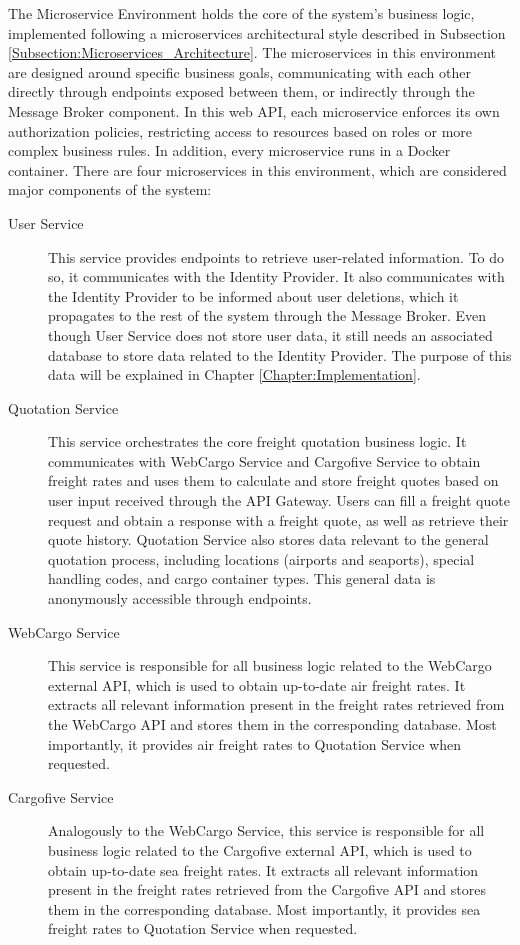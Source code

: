 \documentclass[12pt,reqno, oneside]{amsbook}
\theoremstyle{definition}
\theoremstyle{definition}
\numberwithin{section}{chapter}
\numberwithin{table}{chapter}
\numberwithin{figure}{chapter}
\begin{document}
The Microservice Environment holds the core of the system's business logic, implemented following a microservices architectural style described in Subsection \ref{Subsection:Microservices_Architecture}. The microservices in this environment are designed around specific business goals, communicating with each other directly through endpoints exposed between them, or indirectly through the Message Broker component. In this web \ac{API}, each microservice enforces its own authorization policies, restricting access to resources based on roles or more complex business rules. In addition, every microservice runs in a Docker container.
There are four microservices in this environment, which are considered major components of the system:
\begin{description}
  \item[User Service] This service provides endpoints to retrieve user-related information. To do so, it communicates with the Identity Provider. It also communicates with the Identity Provider to be informed about user deletions, which it propagates to the rest of the system through the Message Broker. Even though User Service does not store user data, it still needs an associated database to store data related to the Identity Provider. The purpose of this data will be explained in Chapter \ref{Chapter:Implementation}.
  \item[Quotation Service] This service orchestrates the core freight quotation business logic. It communicates with WebCargo Service and Cargofive Service to obtain freight rates and uses them to calculate and store freight quotes based on user input received through the \ac{API} Gateway. Users can fill a freight quote request and obtain a response with a freight quote, as well as retrieve their quote history. Quotation Service also stores data relevant to the general quotation process, including locations (airports and seaports), special handling codes, and cargo container types. This general data is anonymously accessible through endpoints.
  \item[WebCargo Service] This service is responsible for all business logic related to the WebCargo external \ac{API}, which is used to obtain up-to-date air freight rates. It extracts all relevant information present in the freight rates retrieved from the WebCargo \ac{API} and stores them in the corresponding database. Most importantly, it provides air freight rates to Quotation Service when requested.
  \item[Cargofive Service] Analogously to the WebCargo Service, this service is responsible for all business logic related to the Cargofive external \ac{API}, which is used to obtain up-to-date sea freight rates. It extracts all relevant information present in the freight rates retrieved from the Cargofive \ac{API} and stores them in the corresponding database. Most importantly, it provides sea freight rates to Quotation Service when requested.
\end{description}
\end{document}
